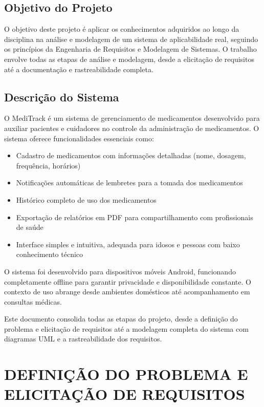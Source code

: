 \documentclass[12pt]{article}
\begin{document}
\subsection{Objetivo do Projeto}

O objetivo deste projeto é aplicar os conhecimentos adquiridos ao longo da disciplina na análise e modelagem de um sistema de aplicabilidade real, seguindo os princípios da Engenharia de Requisitos e Modelagem de Sistemas. O trabalho envolve todas as etapas de análise e modelagem, desde a elicitação de requisitos até a documentação e rastreabilidade completa.

\subsection{Descrição do Sistema}

O MediTrack é um sistema de gerenciamento de medicamentos desenvolvido para auxiliar pacientes e cuidadores no controle da administração de medicamentos. O sistema oferece funcionalidades essenciais como:

\begin{itemize}
    \item Cadastro de medicamentos com informações detalhadas (nome, dosagem, frequência, horários)
    \item Notificações automáticas de lembretes para a tomada dos medicamentos
    \item Histórico completo de uso dos medicamentos
    \item Exportação de relatórios em PDF para compartilhamento com profissionais de saúde
    \item Interface simples e intuitiva, adequada para idosos e pessoas com baixo conhecimento técnico
\end{itemize}

O sistema foi desenvolvido para dispositivos móveis Android, funcionando completamente offline para garantir privacidade e disponibilidade constante. O contexto de uso abrange desde ambientes domésticos até acompanhamento em consultas médicas.

Este documento consolida todas as etapas do projeto, desde a definição do problema e elicitação de requisitos até a modelagem completa do sistema com diagramas UML e a rastreabilidade dos requisitos.

\section{DEFINIÇÃO DO PROBLEMA E ELICITAÇÃO DE REQUISITOS}
\end{document}
